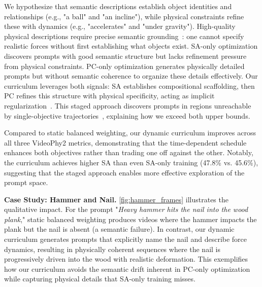 We hypothesize that semantic descriptions establish object identities and relationships (e.g., "a ball" and "an incline"), while physical constraints refine these with dynamics (e.g., "accelerates" and "under gravity"). High-quality physical descriptions require precise semantic grounding~\cite{scholkopf2021toward}: one cannot specify realistic forces without first establishing what objects exist. SA-only optimization discovers prompts with good semantic structure but lacks refinement pressure from physical constraints. PC-only optimization generates physically detailed prompts but without semantic coherence to organize these details effectively. Our curriculum leverages both signals: SA establishes compositional scaffolding, then PC refines this structure with physical specificity, acting as implicit regularization~\cite{liebel2018auxiliary}. This staged approach discovers prompts in regions unreachable by single-objective trajectories~\cite{bengio2009curriculum}, explaining how we exceed both upper bounds.

Compared to static balanced weighting, our dynamic curriculum improves across all three VideoPhy2 metrics, demonstrating that the time-dependent schedule enhances both objectives rather than trading one off against the other. Notably, the curriculum achieves higher SA than even SA-only training (47.8\% vs. 45.6\%), suggesting that the staged approach enables more effective exploration of the prompt space.

\noindent\textbf{Case Study: Hammer and Nail.}
\cref{fig:hammer_frames} illustrates the qualitative impact. For the prompt "\textit{Heavy hammer hits the nail into the wood plank}," static balanced weighting produces videos where the hammer impacts the plank but the nail is absent (a semantic failure). In contrast, our dynamic curriculum generates prompts that explicitly name the nail and describe force dynamics, resulting in physically coherent sequences where the nail is progressively driven into the wood with realistic deformation. This exemplifies how our curriculum avoids the semantic drift inherent in PC-only optimization while capturing physical details that SA-only training misses.



